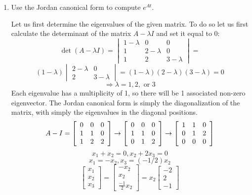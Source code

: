 \documentclass[12pt,letterpaper,reqno]{amsart}
\begin{document}
\begin{enumerate}
\begin{enumerate}
    \item Use the Jordan canonical form to compute $e^{At}$.
    \begin{flushleft}
    Let us first determine the eigenvalues of the given matrix. To do so let us first calculate the determinant of the matrix $A - \lambda I$ and set it equal to $0$:
    $$\det(A-\lambda I) = \begin{vmatrix} { 1 - \lambda } & { 0 } & { 0 } \\ { 1 } & { 2 - \lambda } & { 0 } \\ { 1 } & { 2 } & { 3 - \lambda } \end{vmatrix} = $$
    $$(1- \lambda)\begin{vmatrix} { 2 - \lambda } & { 0 } \\  { 2 } & { 3 - \lambda } \end{vmatrix} = (1- \lambda)(2- \lambda)(3- \lambda) = 0$$
    $$\Rightarrow \lambda = 1, 2,\text{ or }3$$
    Each eigenvalue has a multiplicity of 1, so there will be 1 associated non-zero eigenvector. The Jordan canonical form is simply the diagonalization of the matrix, with simply the eigenvalues in the diagonal positions.
    $$A-I = \left[ \begin{array} { l l l } { 0 } & { 0 } & { 0 } \\ { 1 } & { 1 } & { 0 } \\ { 1 } & { 2 } & { 2 } \end{array} \right] \rightarrow \left[ \begin{array} { l l l } { 0 } & { 0 } & { 0 } \\ { 1 } & { 1 } & { 0 } \\ { 0 } & { 1 } & { 2 } \end{array} \right] \rightarrow \left[ \begin{array} { l l l } { 1 } & { 1 } & { 0 } \\ { 0 } & { 1 } & { 2 } \\ { 0 } & { 0 } & { 0 } \end{array} \right]$$
    $$x_1 + x_2 = 0, x_2 + 2x_3 = 0$$
    $$x_1 = -x_2, x_3 = (-1/2)x_2$$
    $$\left[ \begin{array} { l } { x_1 } \\ { x_2 } \\ { x_3 } \end{array} \right] = \left[ \begin{array} { l } { -x_2 } \\ { x_2 } \\ { \frac{-1}{2}x_2 } \end{array} \right] = x_2 \left[ \begin{array} { l } { -2 } \\ { 2 } \\ { -1 } \end{array} \right]$$

\end{flushleft}
\end{enumerate}
\end{enumerate}
\end{document}
